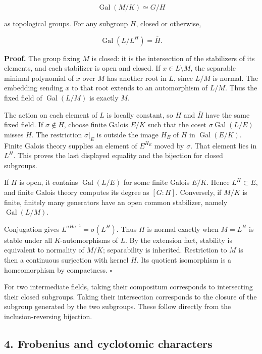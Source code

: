 \documentclass[11pt,a4paper]{article}
\begin{document}
\[
\operatorname{Gal}(M/K)\simeq G/H
\]

as topological groups. For any subgroup \(H\), closed or otherwise,

\[
\operatorname{Gal}(L/L^H)=\overline H.
\]

\textbf{Proof.} The group fixing \(M\) is closed: it is the intersection
of the stabilizers of its elements, and each stabilizer is open and
closed. If \(x\in L\setminus M\), the separable minimal polynomial of
\(x\) over \(M\) has another root in \(L\), since \(L/M\) is normal. The
embedding sending \(x\) to that root extends to an automorphism of
\(L/M\). Thus the fixed field of \(\operatorname{Gal}(L/M)\) is exactly
\(M\).

The action on each element of \(L\) is locally constant, so \(H\) and
\(\overline H\) have the same fixed field. If
\(\sigma\notin\overline H\), choose finite Galois \(E/K\) such that the
coset \(\sigma\operatorname{Gal}(L/E)\) misses \(H\). The restriction
\(\sigma|_E\) is outside the image \(H_E\) of \(H\) in
\(\operatorname{Gal}(E/K)\). Finite Galois theory supplies an element of
\(E^{H_E}\) moved by \(\sigma\). That element lies in \(L^H\). This
proves the last displayed equality and the bijection for closed
subgroups.

If \(H\) is open, it contains \(\operatorname{Gal}(L/E)\) for some
finite Galois \(E/K\). Hence \(L^H\subset E\), and finite Galois theory
computes its degree as \([G:H]\). Conversely, if \(M/K\) is finite,
finitely many generators have an open common stabilizer, namely
\(\operatorname{Gal}(L/M)\).

Conjugation gives \(L^{\sigma H\sigma^{-1}}=\sigma(L^H)\). Thus \(H\) is
normal exactly when \(M=L^H\) is stable under all \(K\)-automorphisms of
\(L\). By the extension fact, stability is equivalent to normality of
\(M/K\); separability is inherited. Restriction to \(M\) is then a
continuous surjection with kernel \(H\). Its quotient isomorphism is a
homeomorphism by compactness. \(\square\)

For two intermediate fields, taking their compositum corresponds to
intersecting their closed subgroups. Taking their intersection
corresponds to the closure of the subgroup generated by the two
subgroups. These follow directly from the inclusion-reversing bijection.

\subsection{4. Frobenius and cyclotomic
characters}\label{frobenius-and-cyclotomic-characters}
\end{document}
